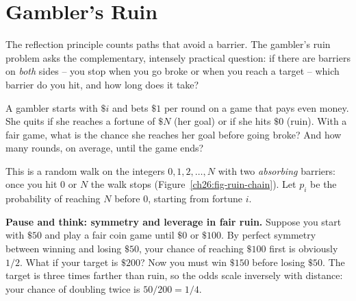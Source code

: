 \section{Gambler's Ruin}
\label{ch26:ruin}

The reflection principle counts paths that avoid a barrier. The gambler's ruin
problem asks the complementary, intensely practical question: if there are
barriers on \emph{both} sides -- you stop when you go broke or when you reach a
target -- which barrier do you hit, and how long does it take?

\begin{walkbox}
A gambler starts with $\$i$ and bets $\$1$ per round on a game that pays even
money. She quits if she reaches a fortune of $\$N$ (her goal) or if she hits
$\$0$ (ruin). With a fair game, what is the chance she reaches her goal before
going broke? And how many rounds, on average, until the game ends?
\end{walkbox}

This is a random walk on the integers $0, 1, 2, \dots, N$ with two
\emph{absorbing} barriers: once you hit $0$ or $N$ the walk stops
(Figure~\ref{ch26:fig-ruin-chain}). Let $p_i$ be the probability of reaching
$N$ before $0$, starting from fortune $i$.

\textbf{Pause and think: symmetry and leverage in fair ruin.} Suppose you
start with $\$50$ and play a fair coin game until $\$0$ or $\$100$. By perfect
symmetry between winning and losing $\$50$, your chance of reaching $\$100$
first is obviously $1/2$. What if your target is $\$200$? Now you must win
$\$150$ before losing $\$50$. The target is three times farther than ruin, so
the odds scale inversely with distance: your chance of doubling twice is
$50/200 = 1/4$.

